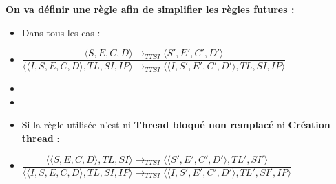\documentclass[10pt,a4paper]{report}
\begin{document}
	
	\textbf{On va définir une règle afin de simplifier les règles futures :} 
	\begin{itemize}
		\item[] Dans tous les cas :
		\item[] \begin{center}
			$\dfrac{\langle S,E,C,D\rangle \longrightarrow_{TTSI} \langle S',E',C',D'\rangle}{\langle\langle I,S,E,C,D\rangle,TL,SI,IP\rangle \longrightarrow_{TTSI} \langle\langle I,S',E',C',D'\rangle,TL,SI,IP\rangle}$
		\end{center}
		\item[]
		\item[]
		\item[] Si la règle utilisée n'est ni \textbf{Thread bloqué non remplacé} ni \textbf{Création thread} :
		\smallbreak 
		\item[] \begin{center}
			$\dfrac{\langle\langle S,E,C,D\rangle,TL,SI\rangle \longrightarrow_{TTSI} \langle\langle S',E',C',D'\rangle,TL',SI'\rangle}{\langle\langle I,S,E,C,D\rangle,TL,SI,IP\rangle \longrightarrow_{TTSI} \langle\langle I,S',E',C',D'\rangle,TL',SI',IP\rangle}$ 
		\end{center}
	\end{itemize}
	\newpage
	
\end{document}
